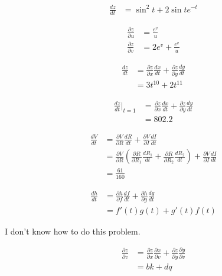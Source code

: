 \documentclass[10pt]{extarticle}
\begin{document}
  \begin{problem}{14.4}
    \begin{description}[font=\normalfont]
      \item[2:]
        \begin{align*}
          \frac{dz}{dt} &= \sin^2 t + 2\sin t e^{-t}
        \end{align*}
      \item[10:]
        \begin{align*}
          \frac{\partial z}{\partial u} &= \frac{e^v}{u}\\
          \frac{\partial z}{\partial v} &= 2e^v + \frac{e^v}{u}
        \end{align*}
      \item[16:]
        \begin{align*}
          \frac{dz}{dt} &= \frac{\partial z}{\partial x}\frac{dx}{dt} + \frac{\partial z}{\partial y}\frac{dy}{dt}\\
                        &= 3t^{10} + 2t^{11}
        \end{align*}
      \item[18:]
        \begin{align*}
          \frac{dz}{dt}\biggr\vert_{t=1} &= \frac{\partial z}{\partial x}\frac{dx}{dt} + \frac{\partial z}{\partial y}\frac{dy}{dt}\\
                                         &= 802.2
        \end{align*}
      \item[20:]
        \begin{align*}
          \frac{dV}{dt} &= \frac{\partial V}{\partial R}\frac{dR}{dt} + \frac{\partial V}{\partial I}\frac{d I}{dt}\\
                        &= \frac{\partial V}{\partial R}\left(\frac{\partial R}{\partial R_1}\frac{dR_1}{dt} + \frac{\partial R}{\partial R_2}\frac{dR_2}{dt}\right) + \frac{\partial V}{\partial I}\frac{dI}{dt}\\
                        &= \frac{61}{160}
        \end{align*}
      \item[30:]
        \begin{align*}
          \frac{dh}{dt} &= \frac{\partial h}{\partial f}\frac{df}{dt} + \frac{\partial h}{\partial g}\frac{dg}{dt}\\
                        &= f'(t)g(t) + g'(t)f(t)
        \end{align*}
      \item[32:] I don't know how to do this problem.
      \item[34:]
        \begin{align*}
          \frac{\partial z}{\partial v} &= \frac{\partial z}{\partial x}\frac{\partial x}{\partial v} + \frac{\partial z}{\partial y}\frac{\partial y}{\partial v}\\
                                        &= bk + dq
        \end{align*}
    \end{description}
  \end{problem}
\end{document}
